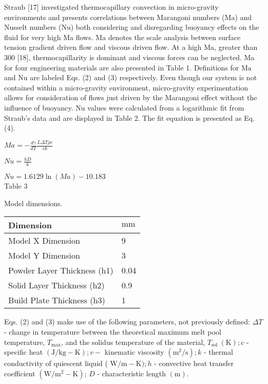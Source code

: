 \documentclass[10pt]{article}
\begin{document}
Straub [17] investigated thermocapillary convection in micro-gravity environments and presents correlations between Marangoni numbers (Ma) and Nusselt numbers (Nu) both considering and disregarding buoyancy effects on the fluid for very high Ma flows. Ma denotes the scale analysis between surface tension gradient driven flow and viscous driven flow. At a high Ma, greater than 300 [18], thermocapillarity is dominant and viscous forces can be neglected. Ma for four engineering materials are also presented in Table 1. Definitions for $\mathrm{Ma}$ and $\mathrm{Nu}$ are labeled Eqs. (2) and (3) respectively. Even though our system is not contained within a micro-gravity environment, micro-gravity experimentation allows for consideration of flows just driven by the Marangoni effect without the influence of buoyancy. Nu values were calculated from a logarithmic fit from Straub's data and are displayed in Table 2. The fit equation is presented as Eq. (4).

$M a=-\frac{d \gamma}{d T} \frac{L \Delta T \rho c}{v k}$

$N u=\frac{h D}{k}$

$N u=1.6129 \ln (M a)-10.183$\\
Table 3

Model dimensions.

\begin{center}
\begin{tabular}{ll}
\hline
Dimension & $\mathrm{mm}$ \\
\hline
Model X Dimension & 9 \\
Model Y Dimension & 3 \\
Powder Layer Thickness (h1) & 0.04 \\
Solid Layer Thickness (h2) & 0.9 \\
Build Plate Thickness (h3) & 1 \\
\hline
\end{tabular}
\end{center}

Eqs. (2) and (3) make use of the following parameters, not previously defined: $\Delta T$ - change in temperature between the theoretical maximum melt pool temperature, $T_{\max }$, and the solidus temperature of the material, $T_{\text {sol }}(\mathrm{K}) ; c$ - specific heat $(\mathrm{J} / \mathrm{kg}-\mathrm{K}) ; v-$ kinematic viscosity $\left(\mathrm{m}^{2} / \mathrm{s}\right) ; k$ - thermal conductivity of quiescent liquid ( $\mathrm{W} / \mathrm{m}-\mathrm{K}) ; h$ - convective heat transfer coefficient $\left(\mathrm{W} / \mathrm{m}^{2}-\mathrm{K}\right)$; $D$ - characteristic length $(\mathrm{m})$.
\end{document}
